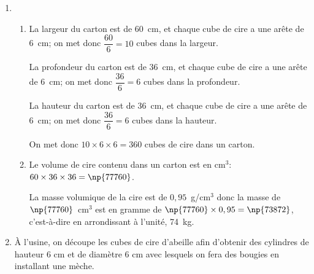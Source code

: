 \begin{enumerate}
\item 
	\begin{enumerate}
		\item %
La largeur du carton est de 60~cm, et chaque cube de cire a une arête de 6~cm; on met donc $\dfrac{60}{6}=10$ cubes dans la largeur.

La profondeur du carton est de 36~cm, et chaque cube de cire a une arête de 6~cm; on met donc $\dfrac{36}{6}=6$ cubes dans la profondeur.
		
La hauteur du carton est de 36~cm, et chaque cube de cire a une arête de 6~cm; on met donc $\dfrac{36}{6}=6$ cubes dans la hauteur.

On met donc $10\times 6 \times 6=360$ cubes de cire dans un carton.		
				
		\item%
Le volume de cire contenu dans un carton est en cm$^3$: $60\times 36\times 36	=\np{77760}$.

La masse volumique de la cire est de $0,95$~g/cm$^3$ donc la masse de $\np{77760}$~cm$^3$ est en gramme de $\np{77760}\times 0,95 = \np{73872}$, c'est-à-dire en arrondissant à l'unité, 74~kg. 
		\end{enumerate}
		
\item À l'usine, on découpe les cubes de cire d'abeille afin d'obtenir des cylindres de hauteur 6 cm et de diamètre 6 cm avec lesquels on fera des bougies en installant une mèche.


\end{enumerate}
